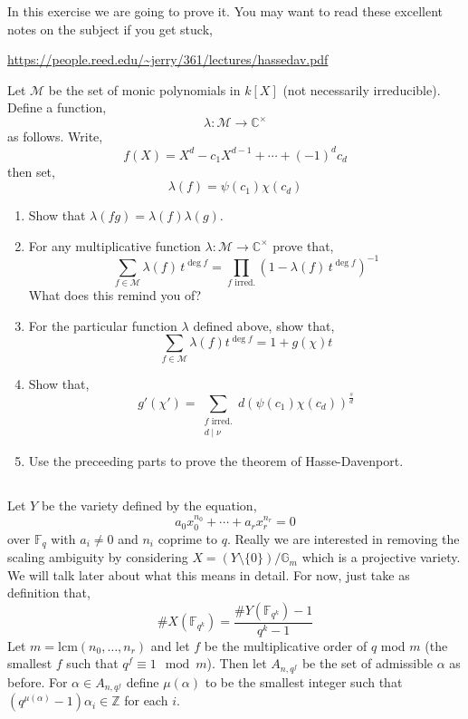 \documentclass[12pt]{article}
\newcommand{\sm}{\! \setminus \!}
\newcommand{\ZZ}{\mathbb{Z}}
\newcommand{\FF}{\mathbb{F}}
\newcommand{\CC}{\mathbb{C}}
\newcommand{\divides}{\mid}
\theoremstyle{remark}
\theoremstyle{definition}
\newcommand{\lcm}{\mathrm{lcm}}
\newcommand{\Gm}{\mathbb{G}_m}
\begin{document}
In this exercise we are going to prove it. You may want to read these excellent notes on the subject if you get stuck,

\newcommand{\M}{\mathcal{M}}

\begin{center}
\url{https://people.reed.edu/~jerry/361/lectures/hassedav.pdf}
\end{center}

Let $\M$ be the set of monic polynomials in $k[X]$ (not necessarily irreducible). Define a function,
\[ \lambda : \M \to \CC^\times \]
as follows. Write,
\[ f(X) = X^d - c_1 X^{d-1} + \cdots + (-1)^d c_d \]
then set,
\[ \lambda(f) = \psi(c_1) \chi(c_d) \]

\begin{enumerate}
\item Show that $\lambda(fg) = \lambda(f) \lambda(g)$.

\item For any multiplicative function $\lambda : \M \to \CC^\times$ prove that,
\[ \sum_{f \in \M} \lambda(f) \, t^{\deg{f}} = \prod_{f \text{ irred.}} (1 - \lambda(f) \, t^{\deg{f}})^{-1} \]
What does this remind you of?

\item For the particular function $\lambda$ defined above, show that,
\[ \sum_{f \in \M} \lambda(f) t^{\deg{f}} = 1 + g(\chi) t \]

\item Show that,
\[ g'(\chi') = \sum_{\substack{f \text{ irred.} \\ d \divides \nu}} d (\psi(c_1) \chi(c_d))^{\frac{s}{d}} \]

\item Use the preceeding parts to prove the theorem of Hasse-Davenport.
\end{enumerate}

\subsection{} \label{proof_of_thm}

Let $Y$ be the variety defined by the equation,
\[ a_0 x_0^{n_0} + \cdots + a_r x_r^{n_r} = 0 \]
over $\FF_q$ with $a_i \neq 0$ and $n_i$ coprime to $q$. Really we are interested in removing the scaling ambiguity by considering $X = (Y \sm \{ 0 \})/\Gm$ which is a projective variety. We will talk later about what this means in detail. For now, just take as definition that,
\[ \# X(\FF_{q^k}) = \frac{\# Y(\FF_{q^k}) - 1}{q^k - 1} \]
Let $m = \lcm{(n_0, \dots, n_r)}$ and let $f$ be the multiplicative order of $q$ mod $m$ (the smallest $f$ such that $q^f \equiv 1 \mod m$). Then let $A_{n,q^f}$ be the set of admissible $\alpha$ as before. For $\alpha \in A_{n,q^f}$ define $\mu(\alpha)$ to be the smallest integer such that $(q^{\mu(\alpha)}-1) \alpha_i \in \ZZ$ for each $i$.
\end{document}
